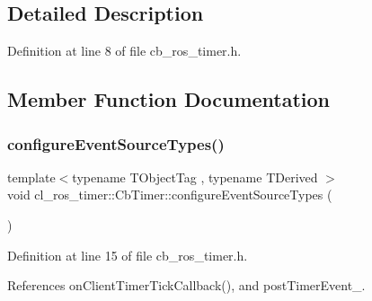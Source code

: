 \subsection{Detailed Description}


Definition at line 8 of file cb\+\_\+ros\+\_\+timer.\+h.



\subsection{Member Function Documentation}
\mbox{\label{classcl__ros__timer_1_1CbTimer_a09267b38fed9b6db637eba8b2f789d1c}} 
\subsubsection{\texorpdfstring{configure\+Event\+Source\+Types()}{configureEventSourceTypes()}}
{\footnotesize\ttfamily template$<$typename T\+Object\+Tag , typename T\+Derived $>$ \\
void cl\+\_\+ros\+\_\+timer\+::\+Cb\+Timer\+::configure\+Event\+Source\+Types (\begin{DoxyParamCaption}{ }\end{DoxyParamCaption})\hspace{0.3cm}{\ttfamily [inline]}}



Definition at line 15 of file cb\+\_\+ros\+\_\+timer.\+h.



References on\+Client\+Timer\+Tick\+Callback(), and post\+Timer\+Event\+\_\+.


